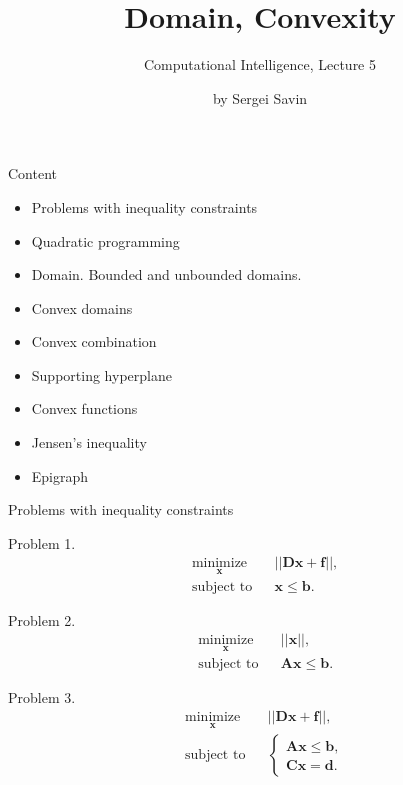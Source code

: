 \documentclass{beamer}
\title{Domain, Convexity}
\subtitle{Computational Intelligence, Lecture 5}
\author{by Sergei Savin}
\date{\mydate}
\begin{document}
\maketitle


\begin{frame}{Content}

\begin{itemize}
\item Problems with inequality constraints
\item Quadratic programming
\item Domain. Bounded and unbounded domains.
\item Convex domains
\item Convex combination
\item Supporting hyperplane
\item Convex functions
\item Jensen’s inequality
\item Epigraph
\end{itemize}

\end{frame}




\begin{frame}{Problems with inequality constraints}
\begin{flushleft}

Problem 1. 
%
\begin{equation}
\begin{aligned}
& \underset{\mathbf{x}}{\text{minimize}}
& & || \mathbf{D}\mathbf{x} + \mathbf{f} ||, \\
& \text{subject to}
& & \mathbf{x} \leq \mathbf{b}.
\end{aligned}
\end{equation}

Problem 2. 
%
\begin{equation}
\begin{aligned}
& \underset{\mathbf{x}}{\text{minimize}}
& & || \mathbf{x} ||, \\
& \text{subject to}
& & \mathbf{A}\mathbf{x} \leq \mathbf{b}.
\end{aligned}
\end{equation}

Problem 3. 
%
\begin{equation}
\begin{aligned}
& \underset{\mathbf{x}}{\text{minimize}}
& & || \mathbf{D}\mathbf{x} + \mathbf{f} ||, \\
& \text{subject to}
& & \begin{cases}
    \mathbf{A}\mathbf{x} \leq \mathbf{b}, \\
    \mathbf{C}\mathbf{x} = \mathbf{d}.
    \end{cases}
\end{aligned}
\end{equation}

\end{flushleft}
\end{frame}
\end{document}
